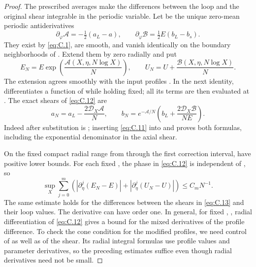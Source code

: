 \begin{proof}
The prescribed averages make the differences between the loop and the original
shear integrable in the periodic variable. Let  be the unique zero-mean periodic
antiderivatives
\begin{equation}
 \partial_\varphi\mathscr A=-\tfrac12(a_L-a),
 \qquad
 \partial_\varphi\mathscr B=\tfrac12E(b_L-b_s).
\tag{C.11}\label{eq:C.11}
\end{equation}
They exist by \eqref{eq:C.1}, are smooth, and vanish identically on the boundary neighborhoods of
.
Extend them by zero radially and put
\begin{equation}
 E_N=E\exp\!\left(\frac{\mathscr A(X,\eta,N\log X)}{N}\right),
 \qquad
 U_N=U+\frac{\mathscr B(X,\eta,N\log X)}{N}.
\tag{C.12}\label{eq:C.12}
\end{equation}
The extension agrees smoothly with the input profiles . In the next identity,
differentiates a function of  while holding  fixed; all its terms are then evaluated at
. The exact shears of \eqref{eq:C.12} are
\begin{equation}
 a_N=a_L-\frac{2\mathcal D_X\mathscr A}{N},
 \qquad
 b_N=e^{-\mathscr A/N}\left(b_L+\frac{2\mathcal D_X\mathscr B}{NE}\right).
\tag{C.13}\label{eq:C.13}
\end{equation}
Indeed  after substitution is
; inserting \eqref{eq:C.11} into
 and
 proves both formulas, including the exponential denominator in the axial
shear.

On the fixed compact radial range from  through the first correction interval,
have positive lower bounds. For each fixed , the phase in \eqref{eq:C.12} is independent of
, so
\begin{equation}
 \sup_X\sum_{j=0}^m
 \left(\left|\partial_\eta^j(E_N-E)\right|
       +\left|\partial_\eta^j(U_N-U)\right|\right)
 \leq C_mN^{-1}.
\tag{C.14}\label{eq:C.14}
\end{equation}
The same estimate holds for the differences between the shears in \eqref{eq:C.13} and their loop
values. The derivative  can have order one. In general, for fixed
, ,
radial differentiation of \eqref{eq:C.12} gives a bound  for the mixed derivatives of the profile
difference. To check the cone condition for the modified profiles, we need control of  as
well as of the shear. Its radial integral formulas use profile values and parameter derivatives,
so the preceding estimates suffice even though radial derivatives need not be small.


\end{proof}
